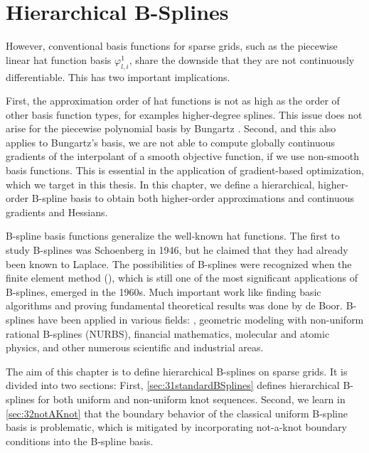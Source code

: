 
\chapter{Hierarchical B-Splines}
\label{chap:30BSplines}





However, conventional basis functions for sparse grids,
such as the piecewise linear hat function basis $\varphi_{l,i}^1$,
share the downside that they are not continuously differentiable.
This has two important implications.

First, the approximation order of hat functions
is not as high as the order of other basis function types,
for examples higher-degree splines.
This issue does not arise for the piecewise polynomial basis
by Bungartz \cite{Bungartz98Finite}.
Second, and this also applies to Bungartz's basis,
we are not able to compute globally continuous gradients of the
interpolant of a smooth objective function,
if we use non-smooth basis functions.
This is essential in the application of gradient-based optimization,
which we target in this thesis.
In this chapter, we define a hierarchical, higher-order B-spline basis
to obtain both higher-order approximations
and continuous gradients and Hessians.

B-spline basis functions generalize the well-known hat functions.
The first to study B-splines was Schoenberg in 1946,
but he claimed that they had already been known to Laplace.
%
The possibilities of B-splines were recognized when
the finite element method (\fem),
which is still one of the most significant applications of B-splines,
emerged in the 1960s.
Much important work like finding basic algorithms and proving fundamental
theoretical results was done by de Boor.
B-splines have been applied in various fields:
\fem,
geometric modeling with non-uniform rational B-splines (NURBS),
financial mathematics,
molecular and atomic physics,
and other numerous scientific and industrial areas.

The aim of this chapter is to define hierarchical B-splines on sparse grids.
It is divided into two sections:
First, \cref{sec:31standardBSplines} defines hierarchical B-splines for both
uniform and non-uniform knot sequences.
Second, we learn in \cref{sec:32notAKnot} that the boundary behavior
of the classical uniform B-spline basis is problematic,
which is mitigated by incorporating not-a-knot boundary conditions
into the B-spline basis.





